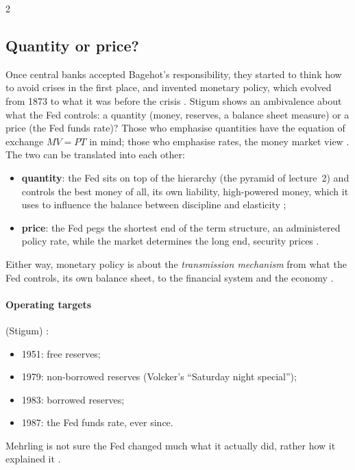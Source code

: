 \begin{paracol}{2}
\subsection{Quantity or price?}
Once central banks accepted Bagehot's responsibility, they started to think how to avoid crises in the first place, and invented monetary policy, which evolved from
1873 to what it was before the crisis . Stigum shows an ambivalence about what the Fed controls: a quantity (money, reserves, a balance
sheet measure) or a price (the Fed funds rate)?  Those who emphasise quantities have the equation of exchange $MV=PT$ in mind; those who
emphasise rates, the money market view . The two can be translated into each other:
\begin{itemize}
  \item \textbf{quantity}: the Fed sits on top of the hierarchy (the pyramid of lecture~2) and controls the best money of all, its own liability, high-powered money,
        which it uses to influence the balance between discipline and elasticity ;
  \item \textbf{price}: the Fed pegs the shortest end of the term structure, an administered policy rate, while the market determines the long end, security prices
        .
\end{itemize}
Either way, monetary policy is about the \emph{transmission mechanism} from what the Fed controls, its own balance sheet, to the financial system and the economy
.

\paragraph{Operating targets} (Stigum) :
\begin{itemize}
  \item 1951: free reserves;
  \item 1979: non-borrowed reserves (Volcker's ``Saturday night special'');
  \item 1983: borrowed reserves;
  \item 1987: the Fed funds rate, ever since.
\end{itemize}
Mehrling is not sure the Fed changed much what it actually did, rather how it explained it .


\end{paracol}
